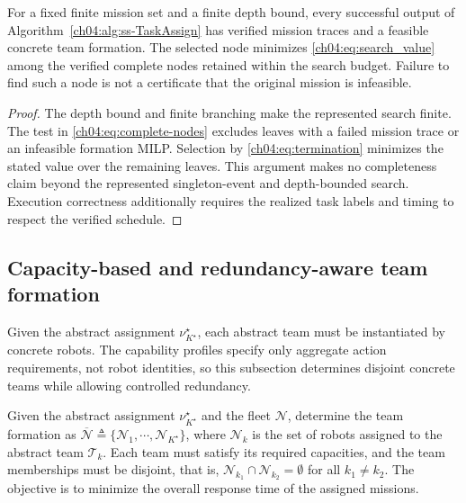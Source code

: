 \begin{revision}
\begin{theorem}
\label{ch04:thm:correctness}
For a fixed finite mission set and a finite depth bound, every successful
output of Algorithm~\ref{ch04:alg:ss-TaskAssign} has verified mission traces
and a feasible concrete team formation. The selected node minimizes
\eqref{ch04:eq:search_value} among the verified complete nodes retained
within the search budget. Failure to find such a node is not a certificate
that the original mission is infeasible.
\end{theorem}
\begin{proof}
The depth bound and finite branching make the represented search finite.
The test in \eqref{ch04:eq:complete-nodes} excludes leaves with a failed
mission trace or an infeasible formation MILP. Selection by
\eqref{ch04:eq:termination} minimizes the stated value over the remaining
leaves. This argument makes no completeness claim beyond the represented
singleton-event and depth-bounded search. Execution correctness additionally
requires the realized task labels and timing to respect the verified schedule.
\end{proof}
\end{revision}

\subsection{Capacity-based and redundancy-aware team formation}
\label{ch04:subsubsec:team_formation}

Given the abstract assignment $\nu_{K^\star}^\star$, each abstract team must be
instantiated by concrete robots. The capability profiles specify only aggregate
action requirements, not robot identities, so this subsection determines
disjoint concrete teams while allowing controlled redundancy.

\begin{problem}
\label{ch04:prob:team_formation}
Given the abstract assignment $\nu_{K^\star}^\star$ and the fleet
$\mathcal{N}$, determine the team formation as
$\overline{\mathcal{N}} \triangleq
\{\mathcal{N}_1,\cdots,\mathcal{N}_{K^\star}\}$,
where $\mathcal{N}_k$ is the set of robots assigned to the abstract team
$\mathcal{T}_k$. Each team must satisfy its required capacities, and the team
memberships must be disjoint, that is,
$\mathcal{N}_{k_1}\cap\mathcal{N}_{k_2}=\emptyset$ for all $k_1\neq k_2$.
The objective is to minimize the overall response time of the assigned
missions.
\end{problem}

